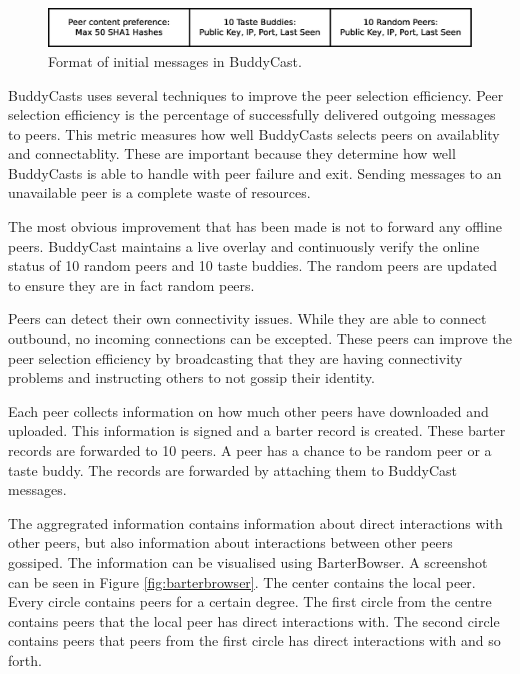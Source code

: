 \begin{figure}
	\centerline{\includegraphics[scale=0.3]{relatedWork/figs/buddycast-format.eps}}
	\caption{Format of initial messages in BuddyCast\cite{pouwelse-buddycast}.}
	\label{fig:buddycast-format}
\end{figure}

BuddyCasts uses several techniques to improve the peer selection efficiency.
Peer selection efficiency is the percentage of successfully delivered outgoing messages to peers.
This metric measures how well BuddyCasts selects peers on availablity and connectablity.
These are important because they determine how well BuddyCasts is able to handle with peer failure and exit.
Sending messages to an unavailable peer is a complete waste of resources.

The most obvious improvement that has been made is not to forward any offline peers.
BuddyCast maintains a live overlay
and continuously verify the online status of 10 random peers and 10 taste buddies.
The random peers are updated to ensure they are in fact random peers.

Peers can detect their own connectivity issues.
While they are able to connect outbound,
no incoming connections can be excepted.
These peers can improve the peer selection efficiency
by broadcasting that they are having connectivity problems
and instructing others to not gossip their identity.

Each peer collects information on how much other peers have downloaded and uploaded.
This information is signed and a barter record is created.
These barter records are forwarded to 10 peers.
A peer has a chance to be random peer or a taste buddy.
The records are forwarded by attaching them to BuddyCast messages.

The aggregrated information contains information about direct interactions with other peers,
but also information about interactions between other peers gossiped.
The information can be visualised using BarterBowser.
A screenshot can be seen in Figure \ref{fig:barterbrowser}.
The center contains the local peer.
Every circle contains peers for a certain degree.
The first circle from the centre contains peers that the local peer has direct interactions with.
The second circle contains peers that peers from the first circle has direct interactions with and so forth.

